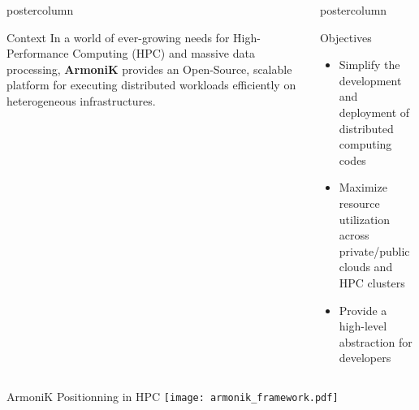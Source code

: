 \begin{frame}[fragile]

  \begin{columns}[T]
    \begin{column}{.49\textwidth}
      \begin{beamercolorbox}[center,wd=\textwidth]{postercolumn}
        \begin{minipage}[T]{.96\textwidth}
            \begin{block}{Context}
              In a world of ever-growing needs for High-Performance Computing (HPC) and massive data processing, \textbf{ArmoniK} provides an Open-Source, scalable platform for executing distributed workloads efficiently on heterogeneous infrastructures.
            \end{block}
        \end{minipage}
      \end{beamercolorbox}
      \vfill
    \end{column}
    \begin{column}{.49\textwidth}
      \begin{beamercolorbox}[center,wd=\textwidth]{postercolumn}
        \begin{minipage}[T]{.96\textwidth}
              \begin{block}{Objectives}
                \begin{itemize}
                  \item Simplify the development and deployment of distributed computing codes
                  \item Maximize resource utilization across private/public clouds and HPC clusters
                  \item Provide a high-level abstraction for developers
                \end{itemize}
              \end{block}
        \end{minipage}
      \end{beamercolorbox}
    \end{column}
  \end{columns}

  \begin{center}
  \begin{minipage}[T]{.975\textwidth}
  \begin{block}{ArmoniK Positionning in HPC}
    \centering
    \texttt{[image: armonik\_framework.pdf]}
  \end{block}
  \end{minipage}
  \end{center}


\end{frame}
